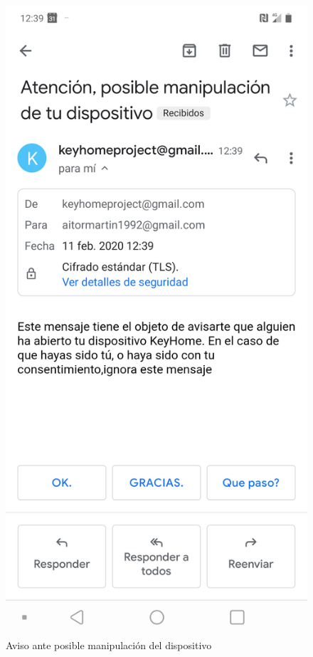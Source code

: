 \begin{figure}[tbp]
\centering
\includegraphics[scale=0.15]{fig/Aviso-ante-posible-manipulacion.png}
\caption{Aviso ante posible manipulación del dispositivo}
\label{fig:aviso-ante-posible-manipulacion}
\end{figure}

